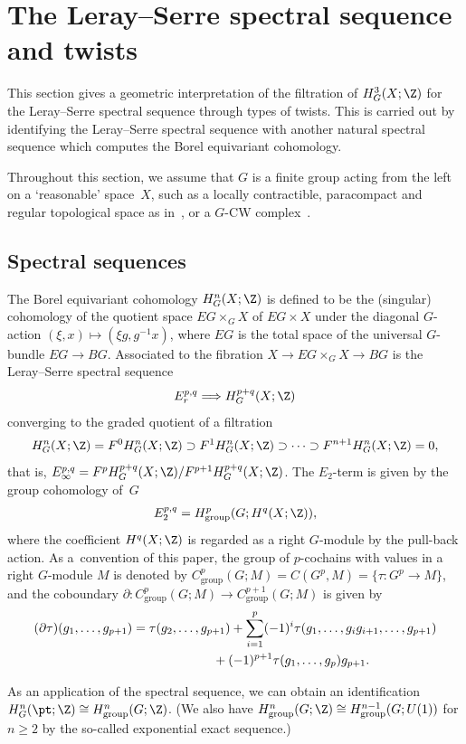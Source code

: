 \section{The Leray--Serre spectral sequence and twists}\label{sec:spectral_seq_and_twist}

This section gives a geometric interpretation of the f\/iltration of $H^3_G(X; \Z)$ for the Leray--Serre spectral sequence through types of twists. This is carried out by identifying the Leray--Serre spectral sequence with another natural spectral sequence which computes the Borel equivariant cohomology.

Throughout this section, we assume that $G$ is a f\/inite group acting from the left on a `reasonable' space~$X$, such as a locally contractible, paracompact and regular topological space as in~\cite{FHT}, or a $G$-CW complex~\cite{May}.

\subsection{Spectral sequences}

The Borel equivariant cohomology $H^n_G(X; \Z)$ is def\/ined to be the (singular) cohomology of the quotient space $EG \times_G X$ of $EG \times X$ under the diagonal $G$-action $(\xi, x) \mapsto (\xi g, g^{-1}x)$, where $EG$ is the total space of the universal $G$-bundle $EG \to BG$. Associated to the f\/ibration $X \to EG \times_G X \to BG$ is the Leray--Serre spectral sequence
\begin{gather*}
E_r^{p, q} \Longrightarrow H^{p+q}_G(X; \Z)
\end{gather*}
converging to the graded quotient of a f\/iltration
\begin{gather*}
H^n_G(X; \Z) = F^0H^n_G(X; \Z) \supset F^1H^n_G(X; \Z) \supset \cdots \supset F^{n+1}H^n_G(X; \Z) = 0,
\end{gather*}
that is, $E_\infty^{p, q} = F^pH^{p+q}_G(X; \Z)/F^{p+1}H^{p+q}_G(X; \Z)$. The $E_2$-term is given by the group cohomology of~$G$
\begin{gather*}
E_2^{p, q} = H^p_{\mathrm{group}}(G; H^q(X; \Z)),
\end{gather*}
where the coef\/f\/icient $H^q(X; \Z)$ is regarded as a right $G$-module by the pull-back action. As a~convention of this paper, the group of $p$-cochains with values in a right $G$-module $M$ is denoted by $C^p_{\mathrm{group}}(G; M) = C(G^p, M) = \{ \tau \colon G^p \to M \}$, and the coboundary $\partial \colon C^p_{\mathrm{group}}(G; M) \to C^{p+1}_{\mathrm{group}}(G; M)$ is given by
\begin{gather*}
(\partial \tau)(g_1, \ldots, g_{p+1})= \tau(g_2, \ldots, g_{p+1})+ \sum_{i = 1}^p (-1)^i \tau(g_1, \ldots, g_ig_{i+1}, \ldots, g_{p+1}) \\
\hphantom{(\partial \tau)(g_1, \ldots, g_{p+1})=}{}+ (-1)^{p+1} \tau(g_1, \ldots, g_p)g_{p+1}.
\end{gather*}

As an application of the spectral sequence, we can obtain an identif\/ication $H^n_G(\pt; \Z) \cong H^n_{\mathrm{group}}(G; \Z)$. (We also have $H^n_{\mathrm{group}}(G; \Z) \cong H^{n-1}_{\mathrm{group}}(G; U(1))$ for $n \ge 2$ by the so-called exponential exact sequence.)
